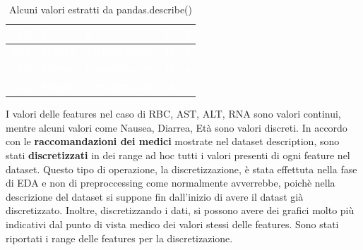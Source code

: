 \begin{table}[ht]
\begin{tabular}{|l|l|l|l|l|}
\hline
\rowcolor{black} \textcolor{white}{\textbf{\textit{25\%}}}  & \textcolor{white}{\textbf{5}}                & \textcolor{white}{\textbf{5}}               & \textcolor{white}{\textbf{6}}                                                                                                                       & \textcolor{white}{\textbf{2}}                                                                                                                                          \\ 
\hline
\rowcolor{black} \textcolor{white}{\textbf{\textit{50\%}}}  & \textcolor{white}{\textbf{251376}}           & \textcolor{white}{\textbf{2.343590e+05}}    & \textcolor{white}{\textbf{10}}                                                                                                                      & \textcolor{white}{\textbf{3}}                                                                                                                                          \\ 
\hline
\rowcolor{black} \textcolor{white}{\textbf{\textit{75\%}}}  & \textcolor{white}{\textbf{517806}}           & \textcolor{white}{\textbf{5.248190e+05}}    & \textcolor{white}{\textbf{13}}                                                                                                                      & \textcolor{white}{\textbf{4}}                                                                                                                                          \\ 
\hline
\rowcolor{black} \textcolor{white}{\textbf{\textit{max}}}   & \textcolor{white}{\textbf{808450}}           & \textcolor{white}{\textbf{3.731527e+06}}    & \textcolor{white}{\textbf{16}}                                                                                                                      & \textcolor{white}{\textbf{4}}                                                                                                                                          \\
\hline
\end{tabular}
\caption{Alcuni valori estratti da pandas.describe()}
\end{table}

I valori delle features nel caso di RBC, AST, ALT, RNA sono valori continui, mentre alcuni valori come Nausea, Diarrea, Età sono valori discreti. In accordo con le \textbf{raccomandazioni dei medici} mostrate nel dataset description, sono stati \textbf{discretizzati} in dei range ad hoc tutti i valori presenti di ogni feature nel dataset. Questo tipo di operazione, la discretizzazione, è stata effettuta nella fase di EDA e non di preproccessing come normalmente avverrebbe, poichè nella descrizione del dataset si suppone fin dall'inizio di avere il datast già discretizzato. Inoltre, discretizzando i dati, si possono avere dei grafici molto più indicativi dal punto di vista medico dei valori stessi delle features. Sono stati riportati i range delle features per la discretizazione.



